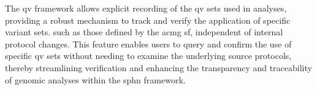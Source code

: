 The \ac{qv} framework allows explicit recording of the \ac{qv} sets used in analyses, providing a robust mechanism to track and verify the application of specific variant sets. such as those defined by the \ac{acmg} \ac{sf}, independent of internal protocol changes. This feature enables users to query and confirm the use of specific \ac{qv} sets without needing to examine the underlying source protocols, thereby streamlining verification and enhancing the transparency and traceability of genomic analyses within the \ac{sphn} framework.

%
%

